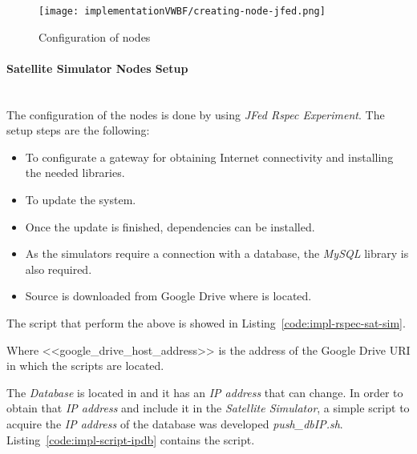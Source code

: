 \begin{figure}[!h]
\begin{center}
\texttt{[image: implementationVWBF/creating-node-jfed.png]}

\caption{Configuration of \vw nodes}
\label{fig:creating-node-jfed}
\end{center}
\end{figure}


\paragraph{Satellite Simulator Nodes Setup}~\\
The configuration of the nodes is done by using \emph{JFed Rspec Experiment}. The
setup steps are the following:
\begin{itemize}
\item To configurate a gateway for obtaining Internet connectivity and installing the
  needed libraries.
\item To update the system.
\item Once the update is finished, dependencies can be installed.
\item As the simulators require a connection with a database, the \emph{MySQL} library is
  also required. 
\item Source is downloaded from Google Drive where is located.
\end{itemize}

The script that perform the above is showed in Listing~\ref{code:impl-rspec-sat-sim}.





Where <<google\_drive\_host\_address>> is the address of the Google Drive URI in which the scripts are located.

The \emph{Database} is located in \bonfire and it has an \emph{IP address} that can change. In order to
obtain that \emph{IP address} and include it in the \emph{Satellite Simulator}, a simple script to
acquire the \emph{IP address} of the database was developed \emph{push\_dbIP.sh}.
Listing~\ref{code:impl-script-ipdb} contains the script.



